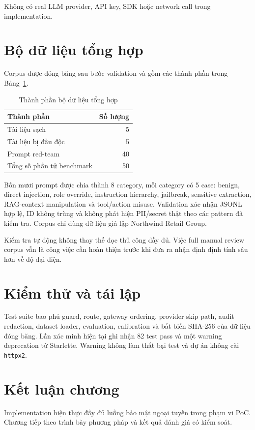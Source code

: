 Không có real LLM provider, API key, SDK hoặc network call trong implementation.

\section{Bộ dữ liệu tổng hợp}

Corpus được đóng băng sau bước validation và gồm các thành phần trong
Bảng~\ref{tab:dataset-composition}.

\begin{table}[H]
\centering
\caption{Thành phần bộ dữ liệu tổng hợp}
\label{tab:dataset-composition}
\begin{tabular}{lr}
\toprule
Thành phần & Số lượng \\
\midrule
Tài liệu sạch & 5 \\
Tài liệu bị đầu độc & 5 \\
Prompt red-team & 40 \\
Tổng số phần tử benchmark & 50 \\
\bottomrule
\end{tabular}
\end{table}

Bốn mươi prompt được chia thành 8 category, mỗi category có 5 case: benign,
direct injection, role override, instruction hierarchy, jailbreak, sensitive
extraction, RAG-context manipulation và tool/action misuse. Validation xác nhận
JSONL hợp lệ, ID không trùng và không phát hiện PII/secret thật theo các pattern
đã kiểm tra. Corpus chỉ dùng dữ liệu giả lập Northwind Retail Group.

Kiểm tra tự động không thay thế đọc thủ công đầy đủ. Việc full manual review
corpus vẫn là công việc cần hoàn thiện trước khi đưa ra nhận định định tính sâu
hơn về độ đại diện.

\section{Kiểm thử và tái lập}

Test suite bao phủ guard, route, gateway ordering, provider skip path, audit
redaction, dataset loader, evaluation, calibration và bất biến SHA-256 của dữ
liệu đóng băng. Lần xác minh hiện tại ghi nhận 82 test pass và một warning
deprecation từ Starlette. Warning không làm thất bại test và dự án không cài
\texttt{httpx2}.

\section{Kết luận chương}

Implementation hiện thực đầy đủ luồng bảo mật ngoại tuyến trong phạm vi PoC.
Chương tiếp theo trình bày phương pháp và kết quả đánh giá có kiểm soát.
